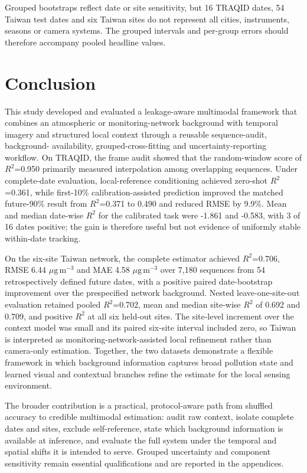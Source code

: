 \documentclass[review,12pt,authoryear]{elsarticle}
\newcommand{\ugm}{\ensuremath{\mu\mathrm{g}\,\mathrm{m}^{-3}}}
\newcommand{\Rtwo}{\ensuremath{R^2}}
\begin{document}
Grouped bootstraps reflect date or site sensitivity, but 16 TRAQID dates, 54
Taiwan test dates and six Taiwan sites do not represent all cities, instruments,
seasons or camera systems. The grouped intervals and per-group errors should
therefore accompany pooled headline values.

\section{Conclusion}

This study developed and evaluated a leakage-aware multimodal framework that
combines an atmospheric or monitoring-network background with temporal imagery
and structured local context through a reusable sequence-audit, background-
availability, grouped-cross-fitting and uncertainty-reporting workflow. On
TRAQID, the frame audit showed that the
random-window score of \Rtwo=0.950 primarily measured interpolation among
overlapping sequences. Under complete-date evaluation, local-reference
conditioning achieved zero-shot \Rtwo=0.361, while first-10\%
calibration-assisted prediction improved the matched future-90\% result from \Rtwo=0.371 to
0.490 and reduced RMSE by 9.9\%. Mean and median date-wise \Rtwo{} for the
calibrated task were -1.861 and -0.583, with 3 of 16 dates positive; the gain is
therefore useful but not evidence of uniformly stable within-date tracking.

On the six-site Taiwan network, the complete estimator achieved
\Rtwo=0.706, RMSE 6.44 \ugm{} and MAE 4.58 \ugm{} over 7,180 sequences from 54
retrospectively defined future dates, with a positive paired date-bootstrap
improvement over the prespecified network background. Nested leave-one-site-out
evaluation retained pooled \Rtwo=0.702, mean and median site-wise \Rtwo{} of
0.692 and 0.709, and positive \Rtwo{} at all six held-out sites. The site-level
increment over the context model was small and its paired six-site interval
included zero, so Taiwan is interpreted as monitoring-network-assisted local
refinement rather than camera-only estimation. Together, the two datasets
demonstrate a flexible framework in which
background information captures broad pollution state and learned visual and
contextual branches refine the estimate for the local sensing environment.

The broader contribution is a practical, protocol-aware path from shuffled
accuracy to credible multimodal estimation: audit raw context, isolate complete
dates and sites, exclude self-reference, state which background information is
available at inference, and evaluate the full system under the temporal and
spatial shifts it is intended to serve. Grouped uncertainty and component
sensitivity remain essential qualifications and are reported in the appendices.
\end{document}

